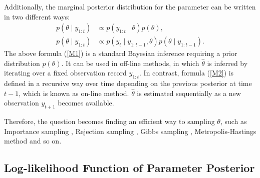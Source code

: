 Additionally, the marginal posterior distribution for the parameter can be written in two different ways: 
\begin{align}\label{M1}
p(\theta \mid y_{1:t}) &\propto p(y_{1:t}\mid\theta)p(\theta),\\
p(\theta \mid y_{1:t}) &\propto p(y_t\mid y_{1:t-1}, \theta)p(\theta\mid y_{1:t-1}). \label{M2}
\end{align}
The above formula (\ref{M1}) is a standard Bayesian inference requiring a prior distribution $p(\theta)$. It can be used in off-line methods, in which $\hat{\theta}$ is inferred by iterating over a fixed observation record $y_{1:t}$. In contrast, formula (\ref{M2}) is defined in a recursive way over time depending on the previous posterior at time $t-1$, which is known as on-line method. $\hat{\theta}$ is estimated sequentially as a new observation $y_{t+1}$ becomes available. 


Therefore, the question becomes finding an efficient way to sampling $\theta$, such as Importance sampling \cite{hammersley1964percolation} \cite{geweke1989bayesian}, Rejection sampling \cite{casella2004generalized} \cite{martino2010generalized}, Gibbs sampling \cite{geman1984stochastic}, Metropolis-Hastings method \cite{metropolis1953equation} \cite{hastings1970monte} and so on. 

\subsection{Log-likelihood Function of Parameter Posterior}\label{sectionlogParameter}

